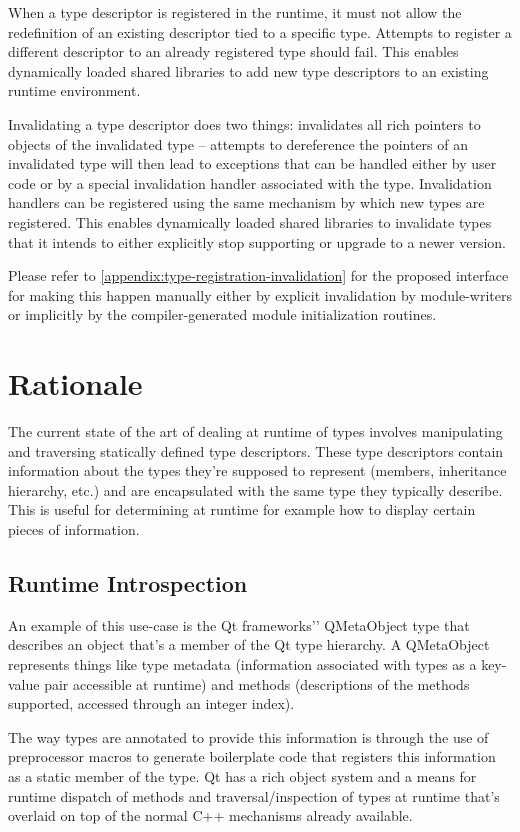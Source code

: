 \documentclass[10pt,a4paper]{article}
\begin{document}
When a type descriptor is registered in the runtime, it must not allow the
redefinition of an existing descriptor tied to a specific type. Attempts to
register a different descriptor to an already registered type should fail. This
enables dynamically loaded shared libraries to add new type descriptors to an
existing runtime environment.

Invalidating a type descriptor does two things: invalidates all rich pointers to
objects of the invalidated type -- attempts to dereference the pointers of an
invalidated type will then lead to exceptions that can be handled either by user
code or by a special invalidation handler associated with the type. Invalidation
handlers can be registered using the same mechanism by which new types are
registered. This enables dynamically loaded shared libraries to invalidate types
that it intends to either explicitly stop supporting or upgrade to a newer
version. 

Please refer to \autoref{appendix:type-registration-invalidation} for the
proposed interface for making this happen manually either by explicit
invalidation by module-writers or implicitly by the compiler-generated module
initialization routines.

\section{Rationale}

The current state of the art of dealing at runtime of types involves
manipulating and traversing statically defined type descriptors. These type
descriptors contain information about the types they’re supposed to represent
(members, inheritance hierarchy, etc.) and are encapsulated with the same type
they typically describe. This is useful for determining at runtime for example
how to display certain pieces of information.

\subsection{Runtime Introspection}

An example of this use-case is the Qt frameworks'’ QMetaObject type that
describes an object that’s a member of the Qt type hierarchy. A QMetaObject
represents things like type metadata (information associated with types as a
key-value pair accessible at runtime) and methods (descriptions of the methods
supported, accessed through an integer index).

The way types are annotated to provide this information is through the use of
preprocessor macros to generate boilerplate code that registers this information
as a static member of the type. Qt has a rich object system and a means for
runtime dispatch of methods and traversal/inspection of types at runtime that’s
overlaid on top of the normal C++ mechanisms already available. 
\end{document}
